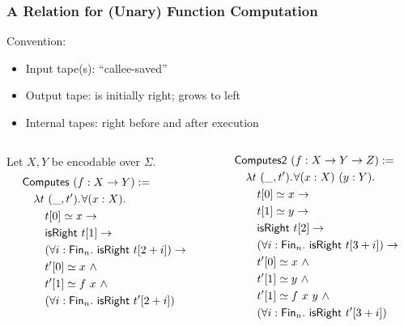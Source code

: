 \documentclass{beamer} %
\renewcommand{\eqsim}{\simeq}
\begin{document}
\begin{frame}[fragile]
  \frametitle{A Relation for (Unary) Function Computation}

  Convention:
  \begin{itemize}
  \item Input tape(s): ``callee-saved''
  \item Output tape: is initially right; grows to left
  \item Internal tapes: right before and after execution
  \end{itemize}
  \pause
  { \footnotesize
    \begin{columns}
      \begin{column}{0.5\textwidth}
        Let $X, Y$ be encodable over $\Sigma$.
        \begin{alignat*}{2}
          & \MS{Computes}~(f:X \to Y) := \\
          & \quad \lam {t~(\_, t')} \forall (x:X). \\
          & \quad\quad t[0] \eqsim x \rightarrow \\
          & \quad\quad \MS{isRight}~t[1] \rightarrow \\
          & \quad\quad (\forall i : \Fin_n.~\MS{isRight}~t[2+i]) \rightarrow \\
          & \quad\quad t'[0] \eqsim x ~\land \\
          & \quad\quad t'[1] \eqsim f~x ~\land \\
          & \quad\quad (\forall i : \Fin_n.~\MS{isRight}~t'[2+i])
        \end{alignat*}
      \end{column}
      \pause
      \begin{column}{0.5\textwidth}
        \begin{alignat*}{2}
          & \MS{Computes2}~(f:X \to Y \to Z) := \\
          & \quad \lam {t~(\_, t')} \forall (x:X)~(y:Y). \\
          & \quad\quad t[0] \eqsim x \rightarrow \\
          & \quad\quad t[1] \eqsim y \rightarrow \\
          & \quad\quad \MS{isRight}~t[2] \rightarrow \\
          & \quad\quad (\forall i : \Fin_n.~\MS{isRight}~t[3+i]) \rightarrow \\
          & \quad\quad t'[0] \eqsim x ~\land \\
          & \quad\quad t'[1] \eqsim y ~\land \\
          & \quad\quad t'[1] \eqsim f~x~y ~\land \\
          & \quad\quad (\forall i : \Fin_n.~\MS{isRight}~t'[3+i])
        \end{alignat*}
      \end{column}
    \end{columns}
  }
\end{frame}
\end{document}
